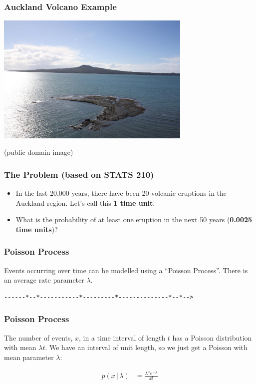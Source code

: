 \documentclass{beamer}
\newcommand{\given}{\,|\,}
\begin{document}
\begin{frame}
\frametitle{Auckland Volcano Example}

\centering
\includegraphics[width=0.7\textwidth]{images/rangitoto.jpg}

(public domain image)

\end{frame}



\begin{frame}
\frametitle{The Problem (based on STATS 210)}

\begin{itemize}
\item In the last 20,000 years, there have been 20 volcanic eruptions in the
Auckland region. Let's call this {\bf 1 time unit}.\pause
\item What is the probability of at least one eruption in the next 50 years
({\bf 0.0025 time units})?
\end{itemize}

\end{frame}


\begin{frame}[fragile]
\frametitle{Poisson Process}
Events occurring over time can be modelled using a ``Poisson Process''.
There is an average rate parameter $\lambda$.

\hspace{3em}
\begin{verbatim}
------*--*-----------*---------*--------------*--*-->
\end{verbatim}

\end{frame}


\begin{frame}
\frametitle{Poisson Process}
The number of events, $x$, in a time interval of length $t$ has a Poisson
distribution with mean $\lambda t$. We have an interval of unit length,
so we just get a Poisson with mean parameter $\lambda$:

\begin{align}
p(x \given \lambda) &= \frac{\lambda^x e^{-\lambda}}{x!}
\end{align}

\end{frame}
\end{document}
